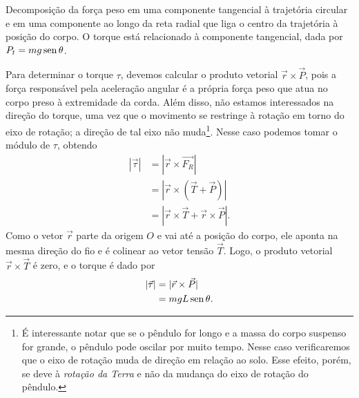 \begin{marginfigure}[2cm]
\centering
{}
\caption{Decomposição da força peso em uma componente tangencial à trajetória circular e em uma componente ao longo da reta radial que liga o centro da trajetória à posição do corpo. O torque está relacionado à componente tangencial, dada por $P_t = mg\operatorname{sen}\theta$.}
\end{marginfigure}

Para determinar o torque $\tau$, devemos calcular o produto vetorial $\vec{r}\times\vec{P}$, pois a força responsável pela aceleração angular é a própria força peso que atua no corpo preso à extremidade da corda. Além disso, não estamos interessados na direção do torque, uma vez que o movimento se restringe à rotação em torno do eixo de rotação; a direção de tal eixo não muda\footnote{É interessante notar que se o pêndulo for longo e a massa do corpo suspenso for grande, o pêndulo pode oscilar por muito tempo. Nesse caso verificaremos que o eixo de rotação muda de direção em relação ao solo. Esse efeito, porém, se deve à \emph{rotação da Terra} e não da mudança do eixo de rotação do pêndulo.}. Nesse caso podemos tomar o módulo de $\tau$, obtendo
\begin{align}
    |\vec{\tau}| &= |\vec{r}\times\vec{F_R}| \\
    &= |\vec{r}\times(\vec{T} + \vec{P})| \\
    &= |\vec{r}\times\vec{T} + \vec{r}\times\vec{P}|.
\end{align}
%
Como o vetor $\vec{r}$ parte da origem $O$ e vai até a posição do corpo, ele aponta na mesma direção do fio e é colinear ao vetor tensão $\vec{T}$. Logo, o produto vetorial $\vec{r}\times\vec{T}$ é zero, e o torque é dado por
\begin{align}
    |\vec{\tau}| &= |\vec{r}\times\vec{P}| \\
    &= mgL\operatorname{sen}\theta.
\end{align}

